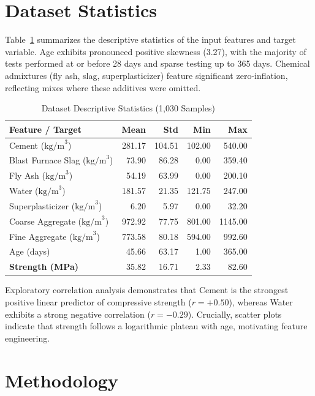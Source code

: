 \documentclass[conference]{IEEEtran}
\begin{document}
\section{Dataset Statistics}
Table~\ref{tab:stats} summarizes the descriptive statistics of the input features and target variable. Age exhibits pronounced positive skewness (3.27), with the majority of tests performed at or before 28 days and sparse testing up to 365 days. Chemical admixtures (fly ash, slag, superplasticizer) feature significant zero-inflation, reflecting mixes where these additives were omitted.

\begin{table}[htbp]
\caption{Dataset Descriptive Statistics (1,030 Samples)}
\label{tab:stats}
\centering
\small
\begin{tabular}{lrrrr}
\toprule
\textbf{Feature / Target} & \textbf{Mean} & \textbf{Std} & \textbf{Min} & \textbf{Max} \\
\midrule
Cement ($\text{kg/m}^3$) & 281.17 & 104.51 & 102.00 & 540.00 \\
Blast Furnace Slag ($\text{kg/m}^3$) & 73.90 & 86.28 & 0.00 & 359.40 \\
Fly Ash ($\text{kg/m}^3$) & 54.19 & 63.99 & 0.00 & 200.10 \\
Water ($\text{kg/m}^3$) & 181.57 & 21.35 & 121.75 & 247.00 \\
Superplasticizer ($\text{kg/m}^3$) & 6.20 & 5.97 & 0.00 & 32.20 \\
Coarse Aggregate ($\text{kg/m}^3$) & 972.92 & 77.75 & 801.00 & 1145.00 \\
Fine Aggregate ($\text{kg/m}^3$) & 773.58 & 80.18 & 594.00 & 992.60 \\
Age (days) & 45.66 & 63.17 & 1.00 & 365.00 \\
\textbf{Strength (MPa)} & 35.82 & 16.71 & 2.33 & 82.60 \\
\bottomrule
\end{tabular}
\end{table}

Exploratory correlation analysis demonstrates that Cement is the strongest positive linear predictor of compressive strength ($r = +0.50$), whereas Water exhibits a strong negative correlation ($r = -0.29$). Crucially, scatter plots indicate that strength follows a logarithmic plateau with age, motivating feature engineering.

\section{Methodology}
\end{document}
